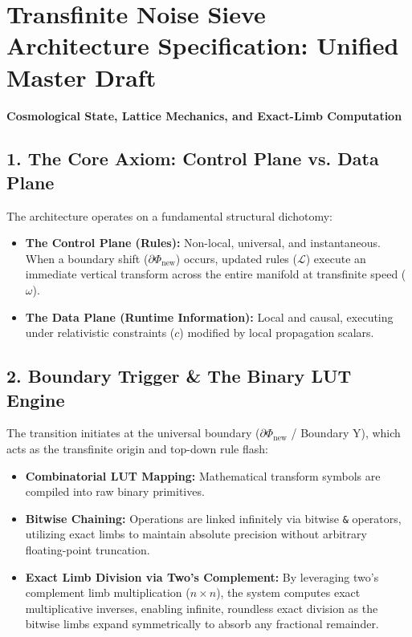 \chapter{\texorpdfstring{Transfinite Noise Sieve Architecture Specification: Unified Master Draft}{Transfinite Noise Sieve Architecture Specification: Unified Master Draft}}
\label{chap:noise-sieve-3-tower-scheduling-floor-minus-4}

\textbf{Cosmological State, Lattice Mechanics, and Exact-Limb Computation}

\medskip

\section{\texorpdfstring{1. The Core Axiom: Control Plane vs. Data Plane}{1. The Core Axiom: Control Plane vs. Data Plane}}

The architecture operates on a fundamental structural dichotomy:

\begin{itemize}
\item \textbf{The Control Plane (Rules):} Non-local, universal, and instantaneous. When a boundary shift (\(\partial\Phi_{\text{new}}\)) occurs, updated rules (\(\mathcal{L}\)) execute an immediate vertical transform across the entire manifold at transfinite speed (\(\omega\)).
\item \textbf{The Data Plane (Runtime Information):} Local and causal, executing under relativistic constraints (\(c\)) modified by local propagation scalars.
\end{itemize}

\medskip

\section{\texorpdfstring{2. Boundary Trigger \& The Binary LUT Engine}{2. Boundary Trigger \& The Binary LUT Engine}}

The transition initiates at the universal boundary (\(\partial\Phi_{\text{new}}\) / Boundary Y), which acts as the transfinite origin and top-down rule flash:

\begin{itemize}
\item \textbf{Combinatorial LUT Mapping:} Mathematical transform symbols are compiled into raw binary primitives.
\item \textbf{Bitwise Chaining:} Operations are linked infinitely via bitwise \texttt{\&} operators, utilizing exact limbs to maintain absolute precision without arbitrary floating-point truncation.
\item \textbf{Exact Limb Division via Two's Complement:} By leveraging two's complement limb multiplication (\(n \times n\)), the system computes exact multiplicative inverses, enabling infinite, roundless exact division as the bitwise limbs expand symmetrically to absorb any fractional remainder.
\end{itemize}

